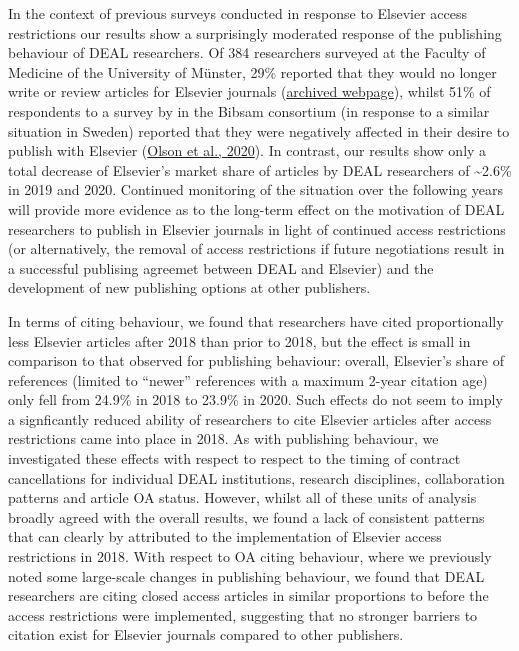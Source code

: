 \documentclass[
]{article}
\begin{document}
In the context of previous surveys conducted in response to Elsevier access restrictions our results show a surprisingly moderated response of the publishing behaviour of DEAL researchers. Of 384 researchers surveyed at the Faculty of Medicine of the University of Münster, 29\% reported that they would no longer write or review articles for Elsevier journals (\href{https://web.archive.org/web/20210429122105/https://www.uni-muenster.de/ZBMed/aktuelles/27850}{archived webpage}), whilst 51\% of respondents to a survey by in the Bibsam consortium (in response to a similar situation in Sweden) reported that they were negatively affected in their desire to publish with Elsevier (\href{http://doi.org/10.1629/uksg.507}{Olson et al., 2020}). In contrast, our results show only a total decrease of Elsevier's market share of articles by DEAL researchers of \textasciitilde2.6\% in 2019 and 2020. Continued monitoring of the situation over the following years will provide more evidence as to the long-term effect on the motivation of DEAL researchers to publish in Elsevier journals in light of continued access restrictions (or alternatively, the removal of access restrictions if future negotiations result in a successful publising agreemet between DEAL and Elsevier) and the development of new publishing options at other publishers.

In terms of citing behaviour, we found that researchers have cited proportionally less Elsevier articles after 2018 than prior to 2018, but the effect is small in comparison to that observed for publishing behaviour: overall, Elsevier's share of references (limited to ``newer'' references with a maximum 2-year citation age) only fell from 24.9\% in 2018 to 23.9\% in 2020. Such effects do not seem to imply a signficantly reduced ability of researchers to cite Elsevier articles after access restrictions came into place in 2018. As with publishing behaviour, we investigated these effects with respect to respect to the timing of contract cancellations for individual DEAL institutions, research disciplines, collaboration patterns and article OA status. However, whilst all of these units of analysis broadly agreed with the overall results, we found a lack of consistent patterns that can clearly by attributed to the implementation of Elsevier access restrictions in 2018. With respect to OA citing behaviour, where we previously noted some large-scale changes in publishing behaviour, we found that DEAL researchers are citing closed access articles in similar proportions to before the access restrictions were implemented, suggesting that no stronger barriers to citation exist for Elsevier journals compared to other publishers.
\end{document}
